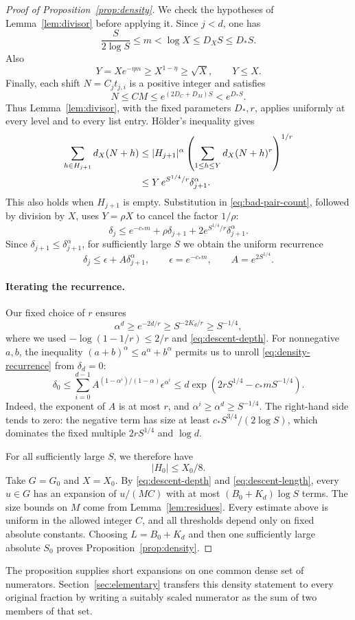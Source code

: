 \begin{proof}[Proof of Proposition~\ref{prop:density}]
We check the hypotheses of Lemma~\ref{lem:divisor} before applying it.
Since \(j<d\), one has
\[
 \frac{S}{2\log S}\le m<\log X\le D_XS\le D_*S.
\]
Also
\[
 Y=Xe^{-\eta m}\ge X^{1-\eta}\ge\sqrt X,
 \qquad Y\le X.
\]
Finally, each shift \(N=C_jt_{j,i}\) is a positive integer and satisfies
\[
 N\le CM\le e^{(2D_C+D_M)S}<e^{D_*S}.
\]
Thus Lemma~\ref{lem:divisor}, with the fixed parameters \(D_*,r\),
applies uniformly at every level and to every list entry.
H\"older's inequality gives
\begin{align}
 \sum_{h\in H_{j+1}}d_X(N+h)
 &\le |H_{j+1}|^\alpha
       \left(\sum_{1\le h\le Y}d_X(N+h)^r\right)^{1/r}\notag\\
 &\le Y\,e^{S^{1/4}/r}\delta_{j+1}^{\alpha}.
 \label{eq:descent-holder}
\end{align}
This also holds when \(H_{j+1}\) is empty.
Substitution in \eqref{eq:bad-pair-count}, followed by division by \(X\),
uses \(Y=\rho X\) to cancel the factor \(1/\rho\):
\[
 \delta_j\le e^{-c_*m}+\rho\delta_{j+1}
                 +2e^{S^{1/4}/r}\delta_{j+1}^{\alpha}.
\]
Since \(\delta_{j+1}\le\delta_{j+1}^{\alpha}\), for sufficiently large
\(S\) we obtain the uniform recurrence
\begin{equation}\label{eq:density-recurrence}
 \delta_j\le\epsilon+A\delta_{j+1}^{\alpha},
 \qquad
 \epsilon=e^{-c_*m},\qquad A=e^{2S^{1/4}}.
\end{equation}

\paragraph{Iterating the recurrence.}
Our fixed choice of \(r\) ensures
\begin{equation}\label{eq:alpha-depth}
 \alpha^d
 \ge e^{-2d/r}
 \ge S^{-2K_d/r}
 \ge S^{-1/4},
\end{equation}
where we used \(-\log(1-1/r)\le2/r\) and
\eqref{eq:descent-depth}.
For nonnegative \(a,b\), the inequality
\((a+b)^\alpha\le a^\alpha+b^\alpha\) permits us to unroll
\eqref{eq:density-recurrence} from \(\delta_d=0\):
\begin{equation}\label{eq:density-unrolled}
 \delta_0\le
 \sum_{i=0}^{d-1}
 A^{(1-\alpha^i)/(1-\alpha)}\epsilon^{\alpha^i}
 \le d\exp\!\left(2rS^{1/4}-c_*mS^{-1/4}\right).
\end{equation}
Indeed, the exponent of \(A\) is at most \(r\), and
\(\alpha^i\ge\alpha^d\ge S^{-1/4}\).
The right-hand side tends to zero: the negative term has size at least
\(c_*S^{3/4}/(2\log S)\), which dominates the fixed multiple
\(2rS^{1/4}\) and \(\log d\).

For all sufficiently large \(S\), we therefore have
\[
 |H_0|\le X_0/8.
\]
Take \(G=G_0\) and \(X=X_0\).  By
\eqref{eq:descent-depth} and \eqref{eq:descent-length}, every \(u\in G\)
has an expansion of \(u/(MC)\) with at most
\((B_0+K_d)\log S\) terms.  The size bounds on \(M\) come from
Lemma~\ref{lem:residues}.  Every estimate above is uniform in the
allowed integer \(C\), and all thresholds depend only on fixed absolute
constants.  Choosing \(L=B_0+K_d\) and then one sufficiently large
absolute \(S_0\) proves Proposition~\ref{prop:density}.
\end{proof}

The proposition supplies short expansions on one common dense set of
numerators.  Section~\ref{sec:elementary} transfers this density statement
to every original fraction by writing a suitably scaled numerator as
the sum of two members of that set.
